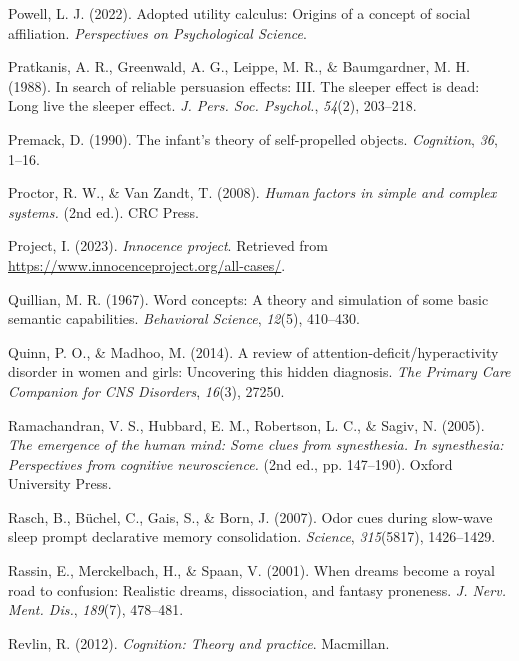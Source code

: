 \documentclass[
]{krantz}
\newlength{\cslhangindent}
\newenvironment{CSLReferences}[2] %
 {\begin{list}{}{%
  \setlength{\itemindent}{0pt}
  \setlength{\leftmargin}{0pt}
  \setlength{\parsep}{0pt}
  \ifodd #1
   \setlength{\leftmargin}{\cslhangindent}
   \setlength{\itemindent}{-1\cslhangindent}
  \fi
  \setlength{\itemsep}{#2\baselineskip}}}
 {\end{list}}
\begin{document}
\begin{CSLReferences}{1}{0}
Powell, L. J. (2022). Adopted utility calculus: Origins of a concept of social affiliation. \emph{Perspectives on Psychological Science}.

Pratkanis, A. R., Greenwald, A. G., Leippe, M. R., \& Baumgardner, M. H. (1988). In search of reliable persuasion effects: {III}. The sleeper effect is dead: Long live the sleeper effect. \emph{J. Pers. Soc. Psychol.}, \emph{54}(2), 203--218.

Premack, D. (1990). The infant's theory of self-propelled objects. \emph{Cognition}, \emph{36}, 1--16.

Proctor, R. W., \& Van Zandt, T. (2008). \emph{Human factors in simple and complex systems.} (2nd ed.). CRC Press.

Project, I. (2023). \emph{Innocence project}. Retrieved from \url{https://www.innocenceproject.org/all-cases/}.

Quillian, M. R. (1967). Word concepts: A theory and simulation of some basic semantic capabilities. \emph{Behavioral Science}, \emph{12}(5), 410--430.

Quinn, P. O., \& Madhoo, M. (2014). A review of attention-deficit/hyperactivity disorder in women and girls: Uncovering this hidden diagnosis. \emph{The Primary Care Companion for CNS Disorders}, \emph{16}(3), 27250.

Ramachandran, V. S., Hubbard, E. M., Robertson, L. C., \& Sagiv, N. (2005). \emph{The emergence of the human mind: Some clues from synesthesia. In synesthesia: Perspectives from cognitive neuroscience.} (2nd ed., pp. 147--190). Oxford University Press.

Rasch, B., Büchel, C., Gais, S., \& Born, J. (2007). Odor cues during slow-wave sleep prompt declarative memory consolidation. \emph{Science}, \emph{315}(5817), 1426--1429.

Rassin, E., Merckelbach, H., \& Spaan, V. (2001). When dreams become a royal road to confusion: Realistic dreams, dissociation, and fantasy proneness. \emph{J. Nerv. Ment. Dis.}, \emph{189}(7), 478--481.

Revlin, R. (2012). \emph{Cognition: Theory and practice}. Macmillan.


\end{CSLReferences}
\end{document}
